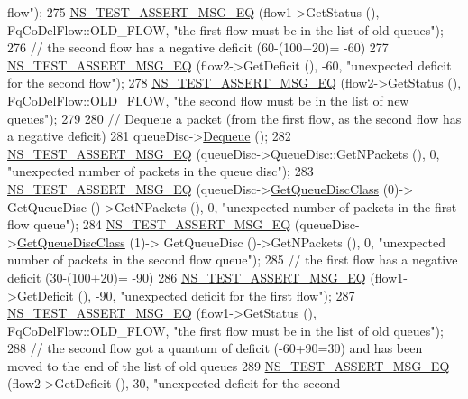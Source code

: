 \begin{DoxyCode}
{       flow"});
275   \hyperlink{group__testing_ga2a9d78cffb3db8e867c35fff0b698cf5}{NS\_TEST\_ASSERT\_MSG\_EQ} (flow1->GetStatus (), FqCoDelFlow::OLD\_FLOW, \textcolor{stringliteral}{"the first flow
       must be in the list of old queues"});
276   \textcolor{comment}{// the second flow has a negative deficit (60-(100+20)= -60)}
277   \hyperlink{group__testing_ga2a9d78cffb3db8e867c35fff0b698cf5}{NS\_TEST\_ASSERT\_MSG\_EQ} (flow2->GetDeficit (), -60, \textcolor{stringliteral}{"unexpected deficit for the second
       flow"});
278   \hyperlink{group__testing_ga2a9d78cffb3db8e867c35fff0b698cf5}{NS\_TEST\_ASSERT\_MSG\_EQ} (flow2->GetStatus (), FqCoDelFlow::OLD\_FLOW, \textcolor{stringliteral}{"the second flow
       must be in the list of new queues"});
279 
280   \textcolor{comment}{// Dequeue a packet (from the first flow, as the second flow has a negative deficit)}
281   queueDisc->\hyperlink{classns3_1_1QueueDisc_a6c13fc489822c1487f61c2289f2e3629}{Dequeue} ();
282   \hyperlink{group__testing_ga2a9d78cffb3db8e867c35fff0b698cf5}{NS\_TEST\_ASSERT\_MSG\_EQ} (queueDisc->QueueDisc::GetNPackets (), 0, \textcolor{stringliteral}{"unexpected number
       of packets in the queue disc"});
283   \hyperlink{group__testing_ga2a9d78cffb3db8e867c35fff0b698cf5}{NS\_TEST\_ASSERT\_MSG\_EQ} (queueDisc->\hyperlink{classns3_1_1QueueDisc_a584d228f7bff3f754d32793a38134556}{GetQueueDiscClass} (0)->
      GetQueueDisc ()->GetNPackets (), 0, \textcolor{stringliteral}{"unexpected number of packets in the first flow queue"});
284   \hyperlink{group__testing_ga2a9d78cffb3db8e867c35fff0b698cf5}{NS\_TEST\_ASSERT\_MSG\_EQ} (queueDisc->\hyperlink{classns3_1_1QueueDisc_a584d228f7bff3f754d32793a38134556}{GetQueueDiscClass} (1)->
      GetQueueDisc ()->GetNPackets (), 0, \textcolor{stringliteral}{"unexpected number of packets in the second flow queue"});
285   \textcolor{comment}{// the first flow has a negative deficit (30-(100+20)= -90)}
286   \hyperlink{group__testing_ga2a9d78cffb3db8e867c35fff0b698cf5}{NS\_TEST\_ASSERT\_MSG\_EQ} (flow1->GetDeficit (), -90, \textcolor{stringliteral}{"unexpected deficit for the first
       flow"});
287   \hyperlink{group__testing_ga2a9d78cffb3db8e867c35fff0b698cf5}{NS\_TEST\_ASSERT\_MSG\_EQ} (flow1->GetStatus (), FqCoDelFlow::OLD\_FLOW, \textcolor{stringliteral}{"the first flow
       must be in the list of old queues"});
288   \textcolor{comment}{// the second flow got a quantum of deficit (-60+90=30) and has been moved to the end of the list of old
       queues}
289   \hyperlink{group__testing_ga2a9d78cffb3db8e867c35fff0b698cf5}{NS\_TEST\_ASSERT\_MSG\_EQ} (flow2->GetDeficit (), 30, \textcolor{stringliteral}{"unexpected deficit for the second
}
\end{DoxyCode}
